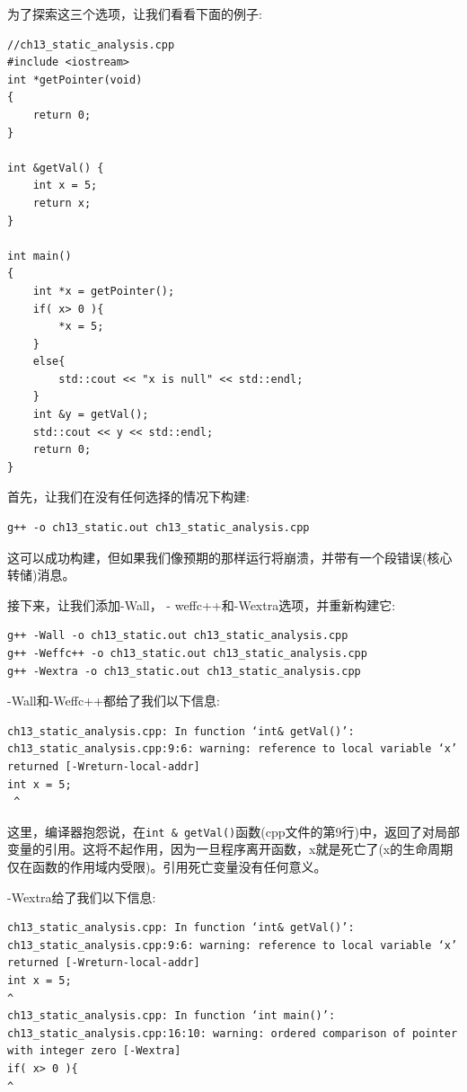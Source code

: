 为了探索这三个选项，让我们看看下面的例子:

\begin{lstlisting}[caption={}]
//ch13_static_analysis.cpp
#include <iostream>
int *getPointer(void)
{
	return 0;
}

int &getVal() {
	int x = 5;
	return x;
}

int main()
{
	int *x = getPointer();
	if( x> 0 ){
		*x = 5;
	}
	else{
		std::cout << "x is null" << std::endl;
	}
	int &y = getVal();
	std::cout << y << std::endl;
	return 0;
}
\end{lstlisting}

首先，让我们在没有任何选择的情况下构建: \par

\begin{lstlisting}[caption={}]
g++ -o ch13_static.out ch13_static_analysis.cpp
\end{lstlisting}

这可以成功构建，但如果我们像预期的那样运行将崩溃，并带有一个段错误(核心转储)消息。 \par
接下来，让我们添加-Wall， - weffc++和-Wextra选项，并重新构建它: \par

\begin{lstlisting}[caption={}]
g++ -Wall -o ch13_static.out ch13_static_analysis.cpp
g++ -Weffc++ -o ch13_static.out ch13_static_analysis.cpp
g++ -Wextra -o ch13_static.out ch13_static_analysis.cpp
\end{lstlisting}

-Wall和-Weffc++都给了我们以下信息: \par

\begin{lstlisting}[caption={}]
ch13_static_analysis.cpp: In function ‘int& getVal()’:
ch13_static_analysis.cpp:9:6: warning: reference to local variable ‘x’
returned [-Wreturn-local-addr]
int x = 5;
 ^
\end{lstlisting}

这里，编译器抱怨说，在\texttt{int \& getVal()}函数(cpp文件的第9行)中，返回了对局部变量的引用。这将不起作用，因为一旦程序离开函数，x就是死亡了(x的生命周期仅在函数的作用域内受限)。引用死亡变量没有任何意义。\par
-Wextra给了我们以下信息: \par
\begin{lstlisting}[caption={}]
ch13_static_analysis.cpp: In function ‘int& getVal()’:
ch13_static_analysis.cpp:9:6: warning: reference to local variable ‘x’
returned [-Wreturn-local-addr]
int x = 5;
^
ch13_static_analysis.cpp: In function ‘int main()’:
ch13_static_analysis.cpp:16:10: warning: ordered comparison of pointer
with integer zero [-Wextra]
if( x> 0 ){
^
\end{lstlisting}

